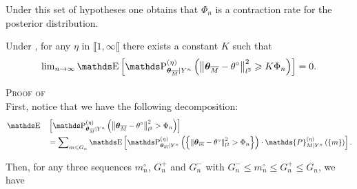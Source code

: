 Under this set of hypotheses one obtains that $\Phi_{n}$ is a contraction rate for the posterior distribution.

\begin{thm}\label{THM_BAYES_STRATEGIES_EXPO}
Under , for any $\eta$ in $\llbracket 1, \infty \llbracket$ there exists a constant $K$ such that
\[\lim\nolimits_{n \rightarrow \infty} \E\left[\P_{\boldsymbol{\theta}_{\overline{M}} \vert Y^{n}}^{(\eta)}\left(\left\Vert \boldsymbol{\theta}_{\overline{M}} - \theta^{\circ} \right\Vert_{l^{2}}^{2} \geq K \Phi_{n}\right)\right] = 0.\]
\reEnd
\end{thm}

\begin{pro}{\textsc{Proof of } \\}\label{PRO_BAYES_STRATEGIES_EXPO}
First, notice that we have the following decomposition:
\begin{alignat*}{2}
& \E&&\left[\P^{(\eta)}_{\boldsymbol{\theta}_{\overline{M}} \vert Y^{n}}\left(\left\Vert \boldsymbol{\theta}_{\overline{M}} - \theta^{\circ}\right\Vert_{l^{2}}^{2} > \Phi_{n} \right)\right]\\
& && = \sum\nolimits_{m \leq G_{n}}\E\left[\P^{(\eta)}_{\boldsymbol{\theta}_{\overline{m}} \vert Y^{n}}\left(\left\{\left\Vert \boldsymbol{\theta}_{\overline{m}} - \theta^{\circ}\right\Vert_{l^{2}}^{2} > \Phi_{n}\right\}\right) \cdot \mathds{P}_{M \vert Y^{n}}^{(\eta)}\left(\{m\}\right)\right].
\end{alignat*}

Then, for any three sequences $m^{\circ}_{n}$, $G^{+}_{n}$ and $G^{-}_{n}$ with $G^{-}_{n} \leq m^{\circ}_{n} \leq G^{+}_{n} \leq G_{n}$, we have


\end{pro}
